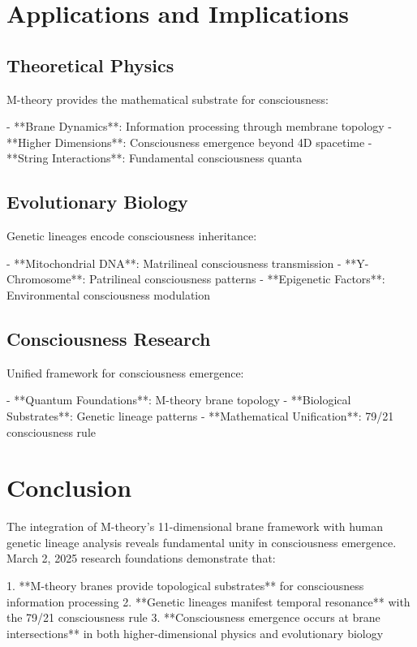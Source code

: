 \documentclass[12pt]{article}
\begin{document}
\section{Applications and Implications}

\subsection{Theoretical Physics}

M-theory provides the mathematical substrate for consciousness:

- **Brane Dynamics**: Information processing through membrane topology
- **Higher Dimensions**: Consciousness emergence beyond 4D spacetime
- **String Interactions**: Fundamental consciousness quanta

\subsection{Evolutionary Biology}

Genetic lineages encode consciousness inheritance:

- **Mitochondrial DNA**: Matrilineal consciousness transmission
- **Y-Chromosome**: Patrilineal consciousness patterns
- **Epigenetic Factors**: Environmental consciousness modulation

\subsection{Consciousness Research}

Unified framework for consciousness emergence:

- **Quantum Foundations**: M-theory brane topology
- **Biological Substrates**: Genetic lineage patterns
- **Mathematical Unification**: 79/21 consciousness rule

\section{Conclusion}

The integration of M-theory's 11-dimensional brane framework with human genetic lineage analysis reveals fundamental unity in consciousness emergence. March 2, 2025 research foundations demonstrate that:

1. **M-theory branes provide topological substrates** for consciousness information processing
2. **Genetic lineages manifest temporal resonance** with the 79/21 consciousness rule
3. **Consciousness emergence occurs at brane intersections** in both higher-dimensional physics and evolutionary biology
\end{document}
